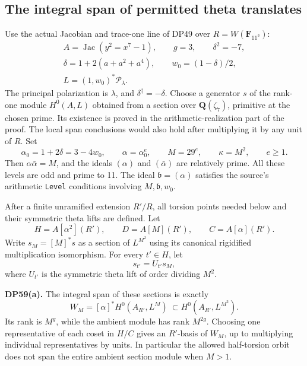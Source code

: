 \subsection{The integral span of permitted theta translates}

\begin{theorem}\label{DP59}
Use the actual Jacobian and trace-one line of DP49 over \(R=W(\mathbf F_{11^3})\): \[
 \begin{gathered}
 A=\operatorname{Jac}(y^2=x^7-1),\qquad g=3,\qquad \delta^2=-7,\\
 \delta=1+2(a+a^2+a^4),\qquad w_0=(1-\delta)/2,\\
 L=(1,w_0)^*\mathcal P_\lambda.
 \end{gathered}
\] The principal polarization is \(\lambda\), and \(\delta^\dagger=-\delta\). Choose a generator \(s\) of the rank-one module \(H^0(A,L)\) obtained from a section over \(\mathbf Q(\zeta_7)\), primitive at the chosen prime. Its existence is proved in the arithmetic-realization part of the proof. The local span conclusions would also hold after multiplying it by any unit of \(R\). Set \[
 \alpha_0=1+2\delta=3-4w_0,\qquad
 \alpha=\alpha_0^e,\qquad M=29^e,\qquad \kappa=M^2,
 \qquad e\ge1.
 \tag{TS1}
\] Then \(\alpha\bar\alpha=M\), and the ideals \((\alpha)\) and \((\bar\alpha)\) are relatively prime. All these levels are odd and prime to 11. The ideal \(\mathfrak b=(\alpha)\) satisfies the source's arithmetic \texttt{Level} conditions involving \(M,\mathfrak b,w_0\).

After a finite unramified extension \(R'/R\), all torsion points needed below and their symmetric theta lifts are defined. Let \[
 H=A[\alpha^2](R'),\qquad D=A[M](R'),\qquad C=A[\alpha](R').
 \tag{TS2}
\] Write \(s_M=[M]^*s\) as a section of \(L^{M^2}\) using its canonical rigidified multiplication isomorphism. For every \(t'\in H\), let \[
 s_{t'}=U_{t'}s_M,
 \tag{TS3}
\] where \(U_{t'}\) is the symmetric theta lift of order dividing \(M^2\).

\textbf{DP59(a).} The integral span of these sections is exactly \[
 W_M=[\alpha]^*H^0(A_{R'},L^M)
       \ \subset H^0(A_{R'},L^{M^2}).
 \tag{TS4}
\] Its rank is \(M^g\), while the ambient module has rank \(M^{2g}\). Choosing one representative of each coset in \(H/C\) gives an \(R'\)-basis of \(W_M\), up to multiplying individual representatives by units. In particular the allowed half-torsion orbit does not span the entire ambient section module when \(M>1\).


\end{theorem}
